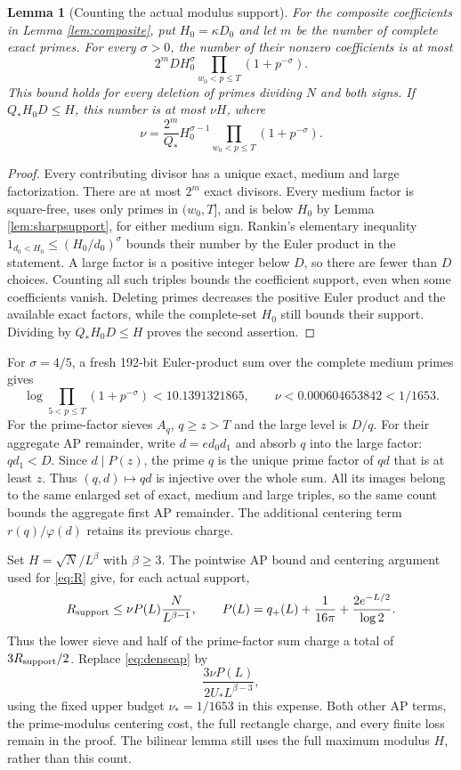 \documentclass[11pt]{article}
\newtheorem{lemma}[theorem]{Lemma}
\begin{document}
\begin{lemma}[Counting the actual modulus support]\label{lem:sparsecount}
For the composite coefficients in Lemma \ref{lem:composite}, put
$H_0=\kappa D_0$ and let $m$ be the number of complete exact primes.
For every $\sigma>0$, the number of their nonzero coefficients is at most
\[
2^m D H_0^\sigma
\prod_{w_0<p\le T}(1+p^{-\sigma}).
\]
This bound holds for every deletion of primes dividing $N$ and both signs.
If $Q_*H_0D\le H$, this number is at most $\nu H$, where
\begin{equation}\label{eq:sparsefraction}
\nu=\frac{2^m}{Q_*}H_0^{\sigma-1}
\prod_{w_0<p\le T}(1+p^{-\sigma}).
\end{equation}
\end{lemma}
\begin{proof}
Every contributing divisor has a unique exact, medium and large factorization.
There are at most $2^m$ exact divisors. Every medium factor is square-free,
uses only primes in $(w_0,T]$, and is below $H_0$ by Lemma
\ref{lem:sharpsupport}, for either medium sign. Rankin's elementary inequality
$1_{d_0<H_0}\le(H_0/d_0)^\sigma$ bounds their number by the Euler product
in the statement. A large factor is a positive integer below $D$,
so there are fewer than $D$ choices. Counting all such triples bounds
the coefficient support, even when some coefficients vanish.
Deleting primes decreases the positive Euler product and the available
exact factors, while the complete-set $H_0$ still bounds their support.
Dividing by $Q_*H_0D\le H$ proves the second assertion.
\end{proof}

For $\sigma=4/5$, a fresh 192-bit Euler-product sum over the complete
medium primes gives
\[
\log\prod_{5<p\le T}(1+p^{-\sigma})<10.1391321865,\qquad
\nu<0.000604653842<1/1653.
\]
For the prime-factor sieves $A_q$, $q\ge z>T$ and the large level is $D/q$.
For their aggregate AP remainder, write $d=e d_0d_1$ and absorb $q$
into the large factor: $qd_1<D$. Since $d\mid P(z)$, the prime $q$
is the unique prime factor of $qd$ that is at least $z$. Thus
$(q,d)\mapsto qd$ is injective over the whole sum. All its images
belong to the same enlarged set of exact, medium and large triples,
so the same count bounds the aggregate first AP remainder.
The additional centering term
$r(q)/\varphi(d)$ retains its previous charge.

Set $H=\sqrt N/L^\beta$ with $\beta\ge3$. The pointwise AP bound and
centering argument used for \eqref{eq:R} give, for each actual support,
\[
R_{\rm support}\le\nu P(L)\frac{N}{L^{\beta-1}},\qquad
P(L)=q_+(L)+\frac1{16\pi}+\frac{2e^{-L/2}}{\log2}.
\]
Thus the lower sieve and half of the prime-factor sum charge a total of
$3R_{\rm support}/2$. Replace \eqref{eq:denseap} by
\begin{equation}\label{eq:sparseap}
\frac{3\nu P(L)}{2U_*L^{\beta-3}},
\end{equation}
using the fixed upper budget $\nu_*=1/1653$ in this expense.
Both other AP terms, the prime-modulus centering cost, the full rectangle
charge, and every finite loss remain in the proof. The bilinear lemma
still uses the full maximum modulus $H$, rather than this count.
\end{document}
